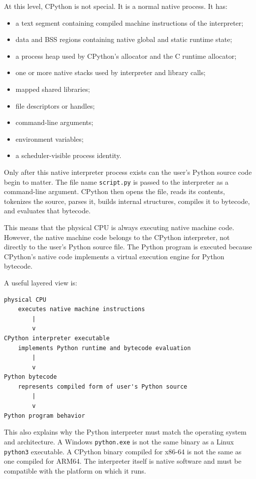 \documentclass[a4paper,twoside]{report}
\begin{document}
At this level, CPython is not special. It is a normal native process. It has:

\begin{itemize}
    \item a text segment containing compiled machine instructions of the interpreter;
    \item data and BSS regions containing native global and static runtime state;
    \item a process heap used by CPython's allocator and the C runtime allocator;
    \item one or more native stacks used by interpreter and library calls;
    \item mapped shared libraries;
    \item file descriptors or handles;
    \item command-line arguments;
    \item environment variables;
    \item a scheduler-visible process identity.
\end{itemize}

Only after this native interpreter process exists can the user's Python source code begin to matter. The file name \texttt{script.py} is passed to the interpreter as a command-line argument. CPython then opens the file, reads its contents, tokenizes the source, parses it, builds internal structures, compiles it to bytecode, and evaluates that bytecode.

This means that the physical CPU is always executing native machine code. However, the native machine code belongs to the CPython interpreter, not directly to the user's Python source file. The Python program is executed because CPython's native code implements a virtual execution engine for Python bytecode.

A useful layered view is:

\begin{verbatim}
physical CPU
    executes native machine instructions
        |
        v
CPython interpreter executable
    implements Python runtime and bytecode evaluation
        |
        v
Python bytecode
    represents compiled form of user's Python source
        |
        v
Python program behavior
\end{verbatim}

This also explains why the Python interpreter must match the operating system and architecture. A Windows \texttt{python.exe} is not the same binary as a Linux \texttt{python3} executable. A CPython binary compiled for x86-64 is not the same as one compiled for ARM64. The interpreter itself is native software and must be compatible with the platform on which it runs.
\end{document}
